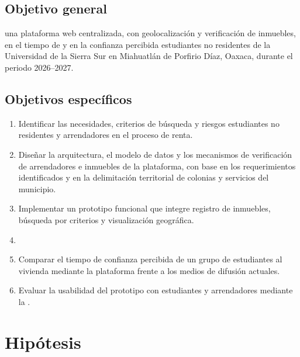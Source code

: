 \subsection{Objetivo general}

 una plataforma web centralizada, con geolocalización y verificación de inmuebles,  en el tiempo de  y en la confianza percibida  estudiantes no residentes de la Universidad de la Sierra Sur en Miahuatlán de Porfirio Díaz, Oaxaca, durante el periodo 2026--2027.

\subsection{Objetivos específicos}

\begin{enumerate}
    \item Identificar las necesidades, criterios de búsqueda y riesgos  estudiantes no residentes y arrendadores en el proceso de renta.
    \item Diseñar la arquitectura, el modelo de datos y los mecanismos de verificación de arrendadores e inmuebles de la plataforma, con base en los requerimientos identificados y en la delimitación territorial de colonias y servicios del municipio.
    \item Implementar un prototipo funcional que integre registro de inmuebles,  búsqueda por criterios y visualización geográfica.
    \item {}
    \item Comparar el tiempo de  confianza percibida de un grupo de estudiantes al  vivienda mediante la plataforma frente a los medios de difusión actuales.
    \item Evaluar la usabilidad  del prototipo con estudiantes y arrendadores mediante la .
\end{enumerate}

\section{Hipótesis}


